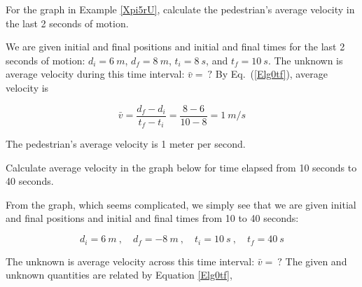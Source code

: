 \documentclass[main.tex]{subfiles}
\begin{document}
\begin{example}
    For the graph in Example \ref{Xpi5rU}, calculate the pedestrian's average velocity in the last 2 seconds of motion.
\end{example}

\Solution We are given initial and final positions and initial and final times for the last 2 seconds of motion: $d_i = \SI{6}{m}$, $d_f = \SI{8}{m}$, $t_i = \SI{8}{s}$, and $t_f = \SI{10}{s}$. The unknown is average velocity during this time interval: $\bar{v} =\ ?$ By Eq.~(\ref{Elg0tf}), average velocity is

\begin{equation*}
    \bar{v} = \frac{d_f - d_i}{t_f - t_i} = \frac{8 - 6}{10 - 8} = \SI{1}{m/s}
\end{equation*}

The pedestrian's average velocity is 1 meter per second.

\solutionEnd

\begin{example}
    Calculate average velocity in the graph below for time elapsed from 10 seconds to 40 seconds.
\end{example}

\begin{center}
\end{center}

\Solution From the graph, which seems complicated, we simply see that we are given initial and final positions and initial and final times from 10 to 40 seconds:

\begin{equation*}
    d_i = \SI{6}{m}\ , \quad
    d_f = \SI{-8}{m}\ , \quad
    t_i = \SI{10}{s}\ , \quad
    t_f = \SI{40}{s}
\end{equation*}

The unknown is average velocity across this time interval: $\bar{v} =\ ?$ The given and unknown quantities are related by Equation \eqref{Elg0tf},
\end{document}
